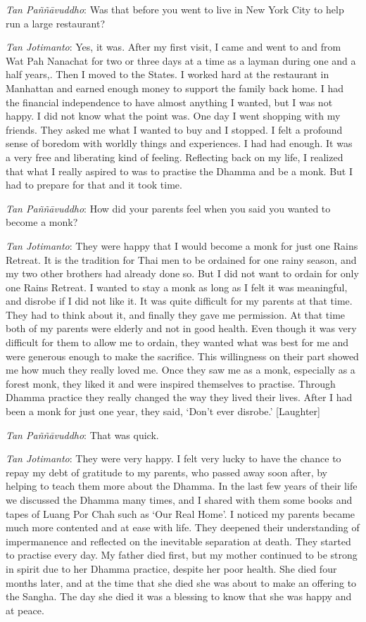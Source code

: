 \emph{Tan Paññāvuddho}‎: Was that before you went to live in New York
City to help run a large restaurant?

\emph{Tan Jotimanto}: Yes, it was. After my first visit, I came and went
to and from Wat Pah Nanachat for two or three days at a time as a layman
during one and a half years,. Then I moved to the States. I worked hard
at the restaurant in Manhattan and earned enough money to support the
family back home. I had the financial independence to have almost
anything I wanted, but I was not happy. I did not know what the point
was. One day I went shopping with my friends. They asked me what I
wanted to buy and I stopped. I felt a profound sense of boredom with
worldly things and experiences. I had had enough. It was a very free and
liberating kind of feeling. Reflecting back on my life, I realized that
what I really aspired to was to practise the Dhamma and be a monk. But I
had to prepare for that and it took time.

\emph{Tan Paññāvuddho}‎: How did your parents feel when you said you
wanted to become a monk?

\emph{Tan Jotimanto}: They were happy that I would become a monk for
just one Rains Retreat. It is the tradition for Thai men to be ordained
for one rainy season, and my two other brothers had already done so. But
I did not want to ordain for only one Rains Retreat. I wanted to stay a
monk as long as I felt it was meaningful, and disrobe if I did not like
it. It was quite difficult for my parents at that time. They had to
think about it, and finally they gave me permission. At that time both
of my parents were elderly and not in good health. Even though it was
very difficult for them to allow me to ordain, they wanted what was best
for me and were generous enough to make the sacrifice. This willingness
on their part showed me how much they really loved me. Once they saw me
as a monk, especially as a forest monk, they liked it and were inspired
themselves to practise. Through Dhamma practice they really changed the
way they lived their lives. After I had been a monk for just one year,
they said, `Don't ever disrobe.' {[}Laughter{]}

\emph{Tan Paññāvuddho}‎: That was quick.

\emph{Tan Jotimanto}: They were very happy. I felt very lucky to have
the chance to repay my debt of gratitude to my parents, who passed away
soon after, by helping to teach them more about the Dhamma. In the last
few years of their life we discussed the Dhamma many times, and I shared
with them some books and tapes of Luang Por Chah such as `Our Real
Home'. I noticed my parents became much more contented and at ease with
life. They deepened their understanding of impermanence and reflected on
the inevitable separation at death. They started to practise every day.
My father died first, but my mother continued to be strong in spirit due
to her Dhamma practice, despite her poor health. She died four months
later, and at the time that she died she was about to make an offering
to the Sangha. The day she died it was a blessing to know that she was
happy and at peace.

